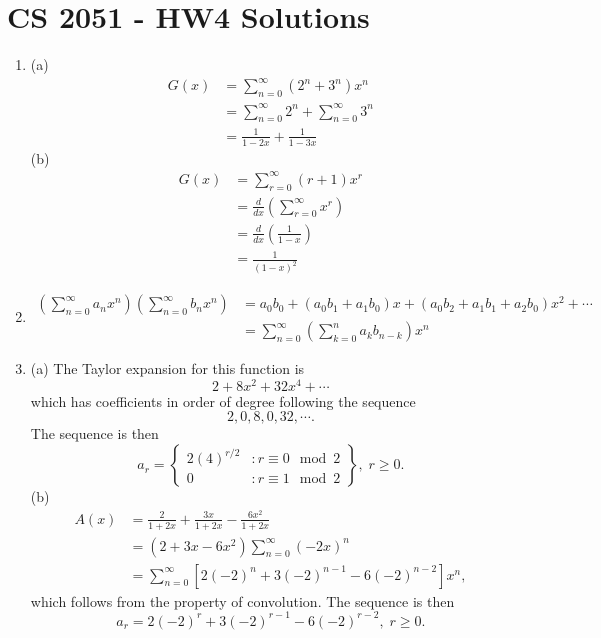 \documentclass[a4paper, 12pt]{article}
\begin{document}
	\section*{CS 2051 - HW4 Solutions}
	
	\begin{enumerate}
		\item (a)
		\begin{align*}
		G(x) &= \sum_{n = 0}^{\infty} (2^n + 3^n)x^n \\
		&= \sum_{n = 0}^{\infty} 2^n + \sum_{n = 0}^{\infty} 3^n \\
		&= \frac{1}{1 - 2x} + \frac{1}{1 - 3x}
		\end{align*}
		(b)
		\begin{align*}
		G(x) &= \sum_{r = 0}^{\infty} (r + 1)x^r \\
		&= \frac{d}{dx}(\sum_{r = 0}^{\infty} x^r) \\
		&= \frac{d}{dx}\left( \frac{1}{1 - x} \right) \\
		&= \frac{1}{(1-x)^2}
		\end{align*}
		
		\item
		\begin{align*}
		\left( \sum_{n = 0}^{\infty}a_nx^n \right) \left( \sum_{n = 0}^{\infty}b_nx^n \right) &= a_0b_0 + (a_0b_1 + a_1b_0)x + (a_0b_2 + a_1b_1 + a_2b_0)x^2 + \cdots \\
		&= \sum_{n = 0}^{\infty}\left( \sum_{k = 0}^{n}a_k b_{n - k} \right)x^n
		\end{align*}
		
		\item (a) The Taylor expansion for this function is
		\[ 2 + 8x^2 + 32x^4 + \cdots \]
		which has coefficients in order of degree following the sequence
		\[ 2, 0, 8, 0, 32, \cdots. \]
		The sequence is then
		\[ a_r = \left\{
			\begin{array}{lr}
				2(4)^{r/2} &: r \equiv 0 \mod{2} \\
				0 &: r \equiv 1 \mod{2}
			\end{array}
		\right\}, \; r \geq 0. \]
		(b)
		\begin{align*}
		A(x) &= \frac{2}{1 + 2x} + \frac{3x}{1 + 2x} - \frac{6x^2}{1 + 2x} \\
		&= (2 + 3x - 6x^2)\sum_{n = 0}^{\infty}(-2x)^n \\
		&= \sum_{n = 0}^{\infty}\left[2(-2)^n + 3(-2)^{n - 1} - 6(-2)^{n - 2}\right]x^n,
		\end{align*}
		which follows from the property of convolution. The sequence is then
		\[ a_r = 2(-2)^r + 3(-2)^{r - 1} - 6(-2)^{r - 2}, \; r \geq 0. \]
		

\end{enumerate}
\end{document}
